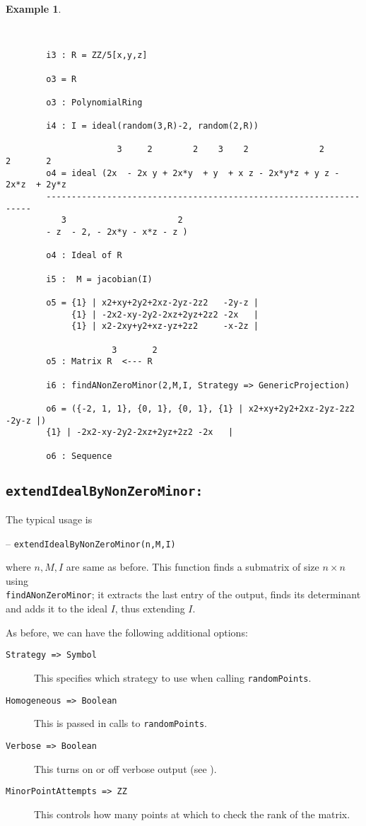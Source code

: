 \documentclass[11pt]{amsart}
\theoremstyle{definition}
\newtheorem{example}{Example}[section]
\begin{document}
\vspace{1em}

\begin{example}~~
	
	~~
	{{\small\color{blue}
		\begin{verbatim}
		i3 : R = ZZ/5[x,y,z]
		
		o3 = R
		
		o3 : PolynomialRing
		
		i4 : I = ideal(random(3,R)-2, random(2,R))
		
		              3     2        2    3    2              2        2       2
		o4 = ideal (2x  - 2x y + 2x*y  + y  + x z - 2x*y*z + y z - 2x*z  + 2y*z 
		-------------------------------------------------------------------
		   3                      2
		- z  - 2, - 2x*y - x*z - z )
		
		o4 : Ideal of R
		
		i5 :  M = jacobian(I)
		
		o5 = {1} | x2+xy+2y2+2xz-2yz-2z2   -2y-z |
		     {1} | -2x2-xy-2y2-2xz+2yz+2z2 -2x   |
		     {1} | x2-2xy+y2+xz-yz+2z2     -x-2z |
		
		             3       2
		o5 : Matrix R  <--- R
		
		i6 : findANonZeroMinor(2,M,I, Strategy => GenericProjection)
		
		o6 = ({-2, 1, 1}, {0, 1}, {0, 1}, {1} | x2+xy+2y2+2xz-2yz-2z2   -2y-z |)
		{1} | -2x2-xy-2y2-2xz+2yz+2z2 -2x   |
		
		o6 : Sequence
		\end{verbatim}
	}}
\end{example}

\subsection{\tt extendIdealByNonZeroMinor:}\label{extendIdealByNonZeroMinor} The typical usage is 

\vspace{1em}
-- {\tt extendIdealByNonZeroMinor(n,M,I)} 

\vspace{1em}
\noindent where $n,M,I$ are same as before. This function finds a submatrix of size $n\times n$ using \\{\tt findANonZeroMinor};  
it extracts the last entry of the output, finds its determinant and
adds it to the ideal $I$, thus extending $I$. 


As before, we can have the following additional options:
\begin{description}
\item[\tt Strategy => Symbol] This specifies which strategy to use when calling {\tt randomPoints}.
\item[\tt Homogeneous => Boolean] This is passed in calls to {\tt randomPoints}.
\item[\tt Verbose => Boolean] This turns on or off verbose output (see ).
\item[\tt MinorPointAttempts => ZZ] This controls how many points at which to check the rank of the matrix.
\end{description}  
\end{document}
